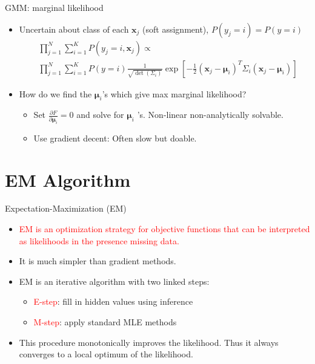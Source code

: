 \documentclass[11.5pt]{beamer}
\begin{document}
\begin{frame}{GMM: marginal likelihood}
\begin{itemize}
	\item Uncertain about class of each $\bm{x}_j$ (soft assignment), $P(y_j=i)=P(y=i)$
	\begin{equation} \nonumber
	\begin{aligned}
	&\prod_{j=1}^{N}\sum_{i=1}^{K}P(y_j=i,\bm{x}_j)\propto \\
	&\prod_{j=1}^{N}\sum_{i=1}^{K}P(y=i)\frac{1}{\sqrt{\det(\Sigma_i)}}\exp \left[-\frac{1}{2}(\bm{x}_j-\bm{\mu}_i)^T\Sigma_i(\bm{x}_j-\bm{\mu}_i)\right]
	\end{aligned}
	\end{equation}
	\item How do we find the $\bm{\mu}_i$'s which give max marginal likelihood?
	\begin{itemize}
	\item Set $\frac{\partial F}{\partial \bm{\mu}_i}=0$ and solve for $\bm{\mu}_i$ 's. Non-linear non-analytically solvable.
	\item Use gradient decent: Often slow but doable.
	\end{itemize}
\end{itemize}
\end{frame}

\section{EM Algorithm}
\begin{frame}{Expectation-Maximization (EM)}
\begin{itemize}
\item \textcolor{red}{EM is an optimization strategy for objective functions that can be interpreted as likelihoods in the presence missing data.}
\item It is much simpler than gradient methods.
\item EM is an iterative algorithm with two linked steps:
\begin{itemize}
\item \textcolor{red}{E-step}: fill in hidden values using inference
\item \textcolor{red}{M-step}: apply standard MLE methods
\end{itemize}
\item This procedure monotonically improves the likelihood. Thus it always converges to a local optimum of the likelihood.
\end{itemize}
\end{frame}
\end{document}
